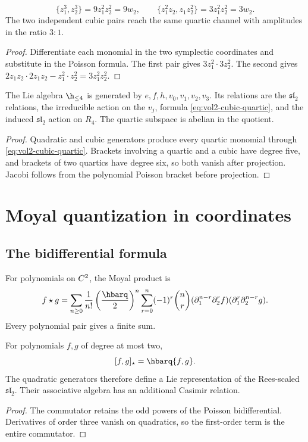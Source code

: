 \begin{calculation}
\[
 \{z_1^3,z_2^3\}=9z_1^2z_2^2=9w_2,
 \qquad
 \{z_1^2z_2,z_1z_2^2\}=3z_1^2z_2^2=3w_2.
\]
The two independent cubic pairs reach the same quartic channel with amplitudes in the ratio $3:1$.
\end{calculation}
\begin{proof}
Differentiate each monomial in the two symplectic coordinates and substitute in the Poisson formula.  The first pair gives $3z_1^2\cdot3z_2^2$.  The second gives $2z_1z_2\cdot2z_1z_2-z_1^2\cdot z_2^2=3z_1^2z_2^2$.
\end{proof}

\begin{theorem}
The Lie algebra $\h_{\le4}$ is generated by $e,f,h,v_0,v_1,v_2,v_3$.  Its relations are the $\mathfrak{sl}_2$ relations, the irreducible action on the $v_j$, formula \eqref{eq:vol2-cubic-quartic}, and the induced $\mathfrak{sl}_2$ action on $R_4$.  The quartic subspace is abelian in the quotient.
\end{theorem}
\begin{proof}
Quadratic and cubic generators produce every quartic monomial through \eqref{eq:vol2-cubic-quartic}.  Brackets involving a quartic and a cubic have degree five, and brackets of two quartics have degree six, so both vanish after projection.  Jacobi follows from the polynomial Poisson bracket before projection.
\end{proof}

\chapter{Moyal quantization in coordinates}
\section{The bidifferential formula}
For polynomials on $C^2$, the Moyal product is
\begin{equation}\label{eq:vol2-moyal}
 f\star g
 =\sum_{n\ge0}\frac1{n!}\left(\frac{\hbarq}{2}\right)^n
 \sum_{r=0}^n(-1)^r\binom nr
 (\partial_1^{n-r}\partial_2^rf)
 (\partial_1^r\partial_2^{n-r}g).
\end{equation}
Every polynomial pair gives a finite sum.

\begin{theorem}
For polynomials $f,g$ of degree at most two,
\[
 [f,g]_\star=\hbarq\{f,g\}.
\]
The quadratic generators therefore define a Lie representation of the Rees-scaled $\mathfrak{sl}_2$.  Their associative algebra has an additional Casimir relation.
\end{theorem}
\begin{proof}
The commutator retains the odd powers of the Poisson bidifferential.  Derivatives of order three vanish on quadratics, so the first-order term is the entire commutator.
\end{proof}

